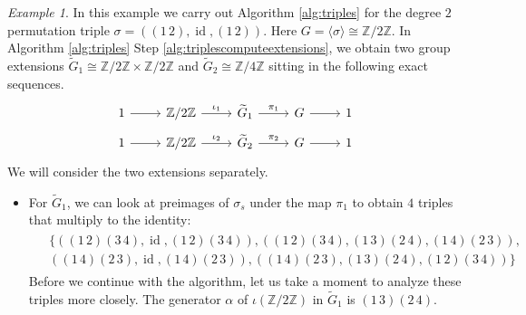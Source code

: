 \documentclass{dcthesis}
\newcommand{\ZZ}{\mathbb Z}
\newcommand{\wt}[1]{\widetilde{#1}}
\DeclareMathOperator{\Lifts}{Lifts}
\DeclareMathOperator{\id}{id}
\numberwithin{equation}{section}
\theoremstyle{definition}
\theoremstyle{remark}
\newtheorem{example}[equation]{Example}
\begin{document}
{{    \begin{example}\label{exm:lift}
      In this example we carry out Algorithm
      \ref{alg:triples} for
      the degree $2$ permutation triple
      $\sigma = ((1\,2),\id,(1\,2))$.
      Here $G = \langle\sigma\rangle\cong\ZZ/2\ZZ$.
      In
      Algorithm \ref{alg:triples}
      Step \ref{alg:triplescomputeextensions},
      we obtain two group extensions
      $\wt{G}_1\cong\ZZ/2\ZZ\times\ZZ/2\ZZ$
      and
      $\wt{G}_2\cong\ZZ/4\ZZ$
      sitting in the following
      exact sequences.
      \begin{align}
        \label{eqn:liftexampleextensions}
        \begin{split}
          \begin{tikzcd}[ampersand replacement=\&, row sep = small]
            1\arrow{r}\&\ZZ/2\ZZ\arrow{r}{\iota_1}\&\wt{G}_1\arrow{r}{\pi_1}\&G\arrow{r}\&1
          \end{tikzcd}
          \\
          \begin{tikzcd}[ampersand replacement=\&, row sep = small]
            1\arrow{r}\&\ZZ/2\ZZ\arrow{r}{\iota_2}\&\wt{G}_2\arrow{r}{\pi_2}\&G\arrow{r}\&1
          \end{tikzcd}
        \end{split}
      \end{align}
      We will consider the
      two extensions separately.
      \begin{itemize}
        \item
          For $\wt{G}_1$,
          we can look at preimages of
          $\sigma_s$ under the map $\pi_1$
          to obtain $4$ triples that
          multiply to the identity:
          \begin{align}
            \label{eqn:examplelifts1}
            \begin{split}
            &\Big\{
              ((1\,2)(3\,4), \id, (1\,2)(3\,4)),
              ((1\,2)(3\,4), (1\,3)(2\,4), (1\,4)(2\,3)),\\
            &((1\,4)(2\,3), \id, (1\,4)(2\,3)),
              ((1\,4)(2\,3), (1\,3)(2\,4), (1\,2)(3\,4))
            \Big\}
            \end{split}
          \end{align}
          Before we continue with the algorithm,
          let us take a moment to
          analyze these triples
          more closely.
          The generator $\alpha$
          of $\iota(\ZZ/2\ZZ)$
          in $\wt{G}_1$ is $(1\,3)(2\,4)$.

\end{itemize}
\end{example}}}
\end{document}
